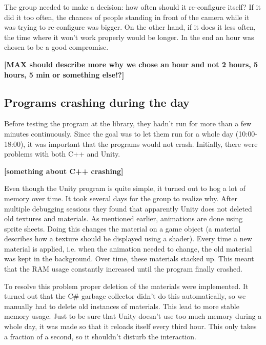 The group needed to make a decision: how often should it re-configure itself? If it did it too often, the chances of people standing in front of the camera while it was trying to re-configure was bigger. On the other hand, if it does it less often, the time where it won't work properly would be longer. In the end an hour was chosen to be a good compromise.

\textbf{[MAX should describe more why we chose an hour and not 2 hours, 5 hours, 5 min or something else!?]}

\subsection{Programs crashing during the day}
Before testing the program at the library, they hadn't run for more than a few minutes continuously. Since the goal was to let them run for a whole day (10:00-18:00), it was important that the programs would not crash. Initially, there were problems with both C++ and Unity.

\textbf{[something about C++ crashing]}

Even though the Unity program is quite simple, it turned out to hog a lot of memory over time. It took several days for the group to realize why. After multiple debugging sessions they found that apparently Unity does not deleted old textures and materials. As mentioned earlier, animations are done using sprite sheets. Doing this changes the material on a game object (a material describes how a texture should be displayed using a shader). Every time a new material is applied, i.e. when the animation needed to change, the old material was kept in the background. Over time, these materials stacked up. This meant that the RAM usage constantly increased until the program finally crashed.

To resolve this problem proper deletion of the materials were implemented. It turned out that the {C\#} garbage collector didn't do this automatically, so we manually had to delete old instances of materials. This lead to more stable memory usage. Just to be sure that Unity doesn't use too much memory during a whole day, it was made so that it reloads itself every third hour. This only takes a fraction of a second, so it shouldn't disturb the interaction.
